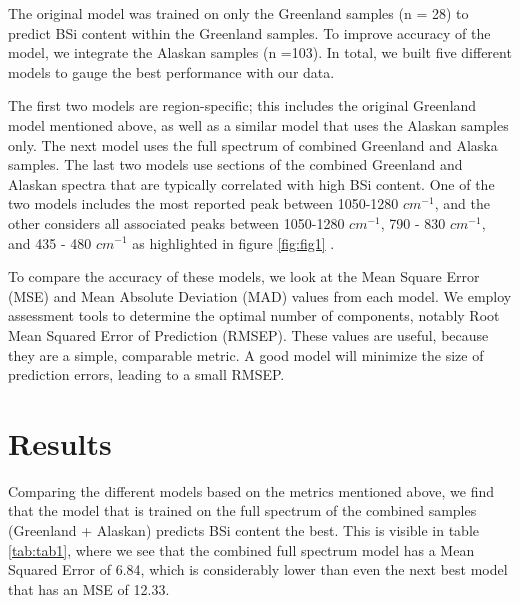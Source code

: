 \documentclass[water,article,submit,moreauthors,pdftex]{mdpi}
\begin{document}
The original model was trained on only the Greenland samples (n = 28) to
predict BSi content within the Greenland samples. To improve accuracy of
the model, we integrate the Alaskan samples (n =103). In total, we built
five different models to gauge the best performance with our data.

The first two models are region-specific; this includes the original
Greenland model mentioned above, as well as a similar model that uses
the Alaskan samples only. The next model uses the full spectrum of
combined Greenland and Alaska samples. The last two models use sections
of the combined Greenland and Alaskan spectra that are typically
correlated with high BSi content. One of the two models includes the
most reported peak between 1050-1280 \(cm^{-1}\), and the other
considers all associated peaks between 1050-1280 \(cm^{-1}\), 790 - 830
\(cm^{-1}\), and 435 - 480 \(cm^{-1}\) as highlighted in figure
\ref{fig:fig1} \citet{rosen2011universally}.

To compare the accuracy of these models, we look at the Mean Square
Error (MSE) and Mean Absolute Deviation (MAD) values from each model. We
employ assessment tools to determine the optimal number of components,
notably Root Mean Squared Error of Prediction (RMSEP). These values are
useful, because they are a simple, comparable metric. A good model will
minimize the size of prediction errors, leading to a small RMSEP.

\hypertarget{results}{%
\section{Results}\label{results}}

Comparing the different models based on the metrics mentioned above, we
find that the model that is trained on the full spectrum of the combined
samples (Greenland + Alaskan) predicts BSi content the best. This is
visible in table \ref{tab:tab1}, where we see that the combined full
spectrum model has a Mean Squared Error of 6.84, which is considerably
lower than even the next best model that has an MSE of 12.33.
\end{document}
